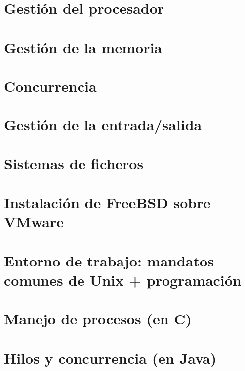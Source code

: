 \documentclass[10pt]{book}
\begin{document}
\chapter{Gestión del procesador}


\chapter{Gestión de la memoria}


\chapter{Concurrencia}


\chapter{Gestión de la entrada/salida}


\chapter{Sistemas de ficheros}

\appendix


\chapter{Instalación de FreeBSD sobre VMware}

\chapter{Entorno de trabajo: mandatos comunes de Unix + programación}

\chapter{Manejo de procesos (en C)}

\chapter{Hilos y concurrencia (en Java)}
\end{document}
